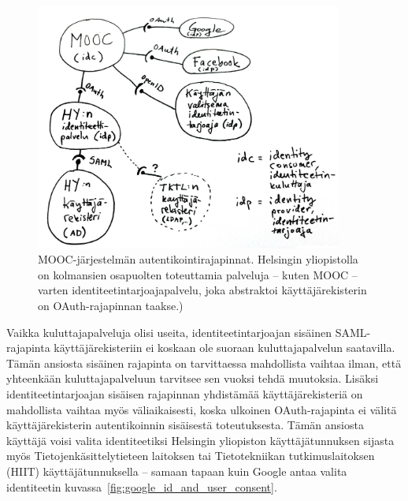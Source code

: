 \documentclass[finnish,gradu]{tktltiki}
\begin{document}
  \begin{figure}
    \centering
    \includegraphics[width=0.9\textwidth]{images/mooc_hy_idp.jpg}
    \caption{MOOC-järjestelmän autentikointirajapinnat. Helsingin yliopistolla on kolmansien osapuolten toteuttamia palveluja -- kuten MOOC -- varten identiteetintarjoajapalvelu, joka abstraktoi käyttäjärekisterin on OAuth-rajapinnan taakse.)}
    \label{fig:mooc_hy_idp}
  \end{figure}

  Vaikka kuluttajapalveluja olisi useita, identiteetintarjoajan sisäinen SAML-rajapinta käyttäjärekisteriin ei koskaan ole suoraan kuluttajapalvelun saatavilla. Tämän ansiosta sisäinen rajapinta on tarvittaessa mahdollista vaihtaa ilman, että yhteenkään kuluttajapalveluun tarvitsee sen vuoksi tehdä muutoksia. Lisäksi identiteetintarjoajan sisäisen rajapinnan yhdistämää käyttäjärekisteriä on mahdollista vaihtaa myös väliaikaisesti, koska ulkoinen OAuth-rajapinta ei välitä käyttäjärekisterin autentikoinnin sisäisestä toteutuksesta. Tämän ansiosta käyttäjä voisi valita identiteetiksi Helsingin yliopiston käyttäjätunnuksen sijasta myös Tietojenkäsittelytieteen laitoksen tai Tietotekniikan tutkimuslaitoksen (HIIT) käyttäjätunnuksella -- samaan tapaan kuin Google antaa valita identiteetin kuvassa~\ref{fig:google_id_and_user_consent}.
\end{document}
